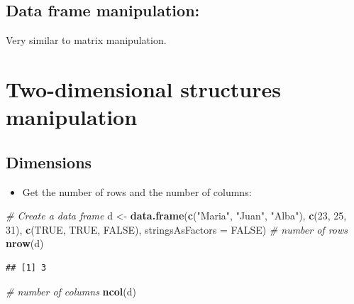 \documentclass[]{book}
\newenvironment{Shaded}{\begin{snugshade}}{\end{snugshade}}
\newcommand{\CommentTok}[1]{\textcolor[rgb]{0.56,0.35,0.01}{\textit{#1}}}
\newcommand{\DataTypeTok}[1]{\textcolor[rgb]{0.13,0.29,0.53}{#1}}
\newcommand{\DecValTok}[1]{\textcolor[rgb]{0.00,0.00,0.81}{#1}}
\newcommand{\KeywordTok}[1]{\textcolor[rgb]{0.13,0.29,0.53}{\textbf{#1}}}
\newcommand{\NormalTok}[1]{#1}
\newcommand{\OtherTok}[1]{\textcolor[rgb]{0.56,0.35,0.01}{#1}}
\newcommand{\StringTok}[1]{\textcolor[rgb]{0.31,0.60,0.02}{#1}}
\providecommand{\tightlist}{%
  \setlength{\itemsep}{0pt}\setlength{\parskip}{0pt}}
\begin{document}
\hypertarget{data-frame-manipulation}{%
\subsection{Data frame manipulation:}\label{data-frame-manipulation}}

Very similar to matrix manipulation.

\hypertarget{two-dimensional-structures-manipulation}{%
\section{Two-dimensional structures manipulation}\label{two-dimensional-structures-manipulation}}

\hypertarget{dimensions}{%
\subsection{Dimensions}\label{dimensions}}

\begin{itemize}
\tightlist
\item
  Get the number of rows and the number of columns:
\end{itemize}

\begin{Shaded}
\begin{Highlighting}[]
\CommentTok{# Create a data frame}
\NormalTok{d <-}\StringTok{ }\KeywordTok{data.frame}\NormalTok{(}\KeywordTok{c}\NormalTok{(}\StringTok{"Maria"}\NormalTok{, }\StringTok{"Juan"}\NormalTok{, }\StringTok{"Alba"}\NormalTok{),}
    \KeywordTok{c}\NormalTok{(}\DecValTok{23}\NormalTok{, }\DecValTok{25}\NormalTok{, }\DecValTok{31}\NormalTok{),}
    \KeywordTok{c}\NormalTok{(}\OtherTok{TRUE}\NormalTok{, }\OtherTok{TRUE}\NormalTok{, }\OtherTok{FALSE}\NormalTok{),}
    \DataTypeTok{stringsAsFactors =} \OtherTok{FALSE}\NormalTok{)}
\CommentTok{# number of rows}
\KeywordTok{nrow}\NormalTok{(d)}
\end{Highlighting}
\end{Shaded}

\begin{verbatim}
## [1] 3
\end{verbatim}

\begin{Shaded}
\begin{Highlighting}[]
\CommentTok{# number of columns}
\KeywordTok{ncol}\NormalTok{(d)}
\end{Highlighting}
\end{Shaded}
\end{document}
